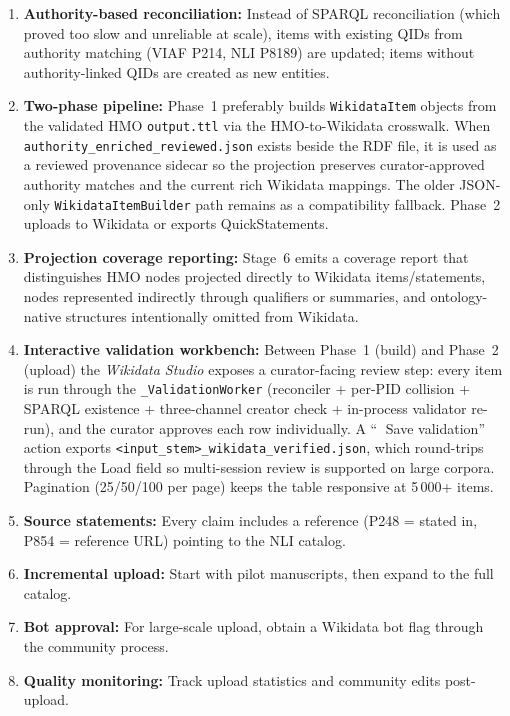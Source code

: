 \documentclass[12pt]{article}
\newcommand{\code}[1]{\texttt{#1}}
\begin{document}
\begin{enumerate}
\item \textbf{Authority-based reconciliation:} Instead of SPARQL reconciliation (which proved too slow and unreliable at scale), items with existing QIDs from authority matching (VIAF P214, NLI P8189) are updated; items without authority-linked QIDs are created as new entities.
\item \textbf{Two-phase pipeline:} Phase~1 preferably builds \code{WikidataItem} objects from the validated HMO \code{output.ttl} via the HMO-to-Wikidata crosswalk. When \code{authority\_enriched\_reviewed.json} exists beside the RDF file, it is used as a reviewed provenance sidecar so the projection preserves curator-approved authority matches and the current rich Wikidata mappings. The older JSON-only \code{WikidataItemBuilder} path remains as a compatibility fallback. Phase~2 uploads to Wikidata or exports QuickStatements.
\item \textbf{Projection coverage reporting:} Stage~6 emits a coverage report that distinguishes HMO nodes projected directly to Wikidata items/statements, nodes represented indirectly through qualifiers or summaries, and ontology-native structures intentionally omitted from Wikidata.
\item \textbf{Interactive validation workbench:} Between Phase~1 (build) and Phase~2 (upload) the \emph{Wikidata Studio} exposes a curator-facing review step: every item is run through the \code{\_ValidationWorker} (reconciler + per-PID collision + SPARQL existence + three-channel creator check + in-process validator re-run), and the curator approves each row individually. A ``💾 Save validation'' action exports \code{<input\_stem>\_wikidata\_verified.json}, which round-trips through the Load field so multi-session review is supported on large corpora. Pagination (25/50/100 per page) keeps the table responsive at 5\,000+ items.
\item \textbf{Source statements:} Every claim includes a reference (P248 = stated in, P854 = reference URL) pointing to the NLI catalog.
\item \textbf{Incremental upload:} Start with pilot manuscripts, then expand to the full catalog.
\item \textbf{Bot approval:} For large-scale upload, obtain a Wikidata bot flag through the community process.
\item \textbf{Quality monitoring:} Track upload statistics and community edits post-upload.
\end{enumerate}
\end{document}
